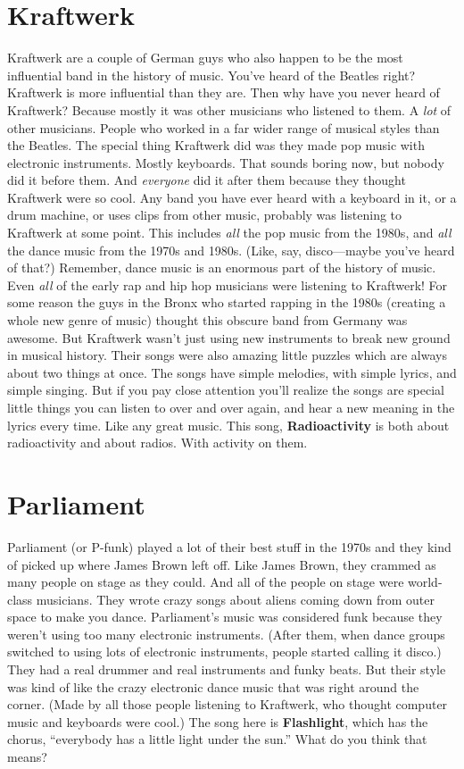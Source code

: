 \documentclass[letterpaper,single]{article}
\begin{document}
\section{Kraftwerk}
Kraftwerk are a couple of German guys who also happen to be the most influential band in the history of music. 
You've heard of the Beatles right? 
Kraftwerk is more influential than they are. 
Then why have you never heard of Kraftwerk? 
Because mostly it was other musicians who listened to them. 
A \emph{lot} of other musicians. 
People who worked in a far wider range of musical styles than the Beatles. 
The special thing Kraftwerk did was they made pop music with electronic instruments. 
Mostly keyboards. 
That sounds boring now, but nobody did it before them. 
And \emph{everyone} did it after them because they thought Kraftwerk were so cool. 
Any band you have ever heard with a keyboard in it, or a drum machine, or uses clips from other music, probably was listening to Kraftwerk at some point. 
This includes \emph{all} the pop music from the 1980s, and \emph{all} the dance music from the 1970s and 1980s. (Like, say, disco---maybe you've heard of that?)
Remember, dance music is an enormous part of the history of music.
Even \emph{all} of the early rap and hip hop musicians were listening to Kraftwerk! 
For some reason the guys in the Bronx who started rapping in the 1980s (creating a whole new genre of music) thought this obscure band from Germany was awesome. 
But Kraftwerk wasn't just using new instruments to break new ground in musical history. 
Their songs were also amazing little puzzles which are always about two things at once. 
The songs have simple melodies, with simple lyrics, and simple singing. 
But if you pay close attention you'll realize the songs are special little things you can listen to over and over again, and hear a new meaning in the lyrics every time. 
Like any great music. 
This song, \textbf{Radioactivity} is both about radioactivity and about radios. With activity on them.

\section{Parliament}
Parliament (or P-funk) played a lot of their best stuff in the 1970s and they kind of picked up where James Brown left off. 
Like James Brown, they crammed as many people on stage as they could. 
And all of the people on stage were world-class musicians. 
They wrote crazy songs about aliens coming down from outer space to make you dance. 
Parliament's music was considered funk because they weren't using too many electronic instruments. 
(After them, when dance groups switched to using lots of electronic instruments, people started calling it disco.) 
They had a real drummer and real instruments and funky beats.
But their style was kind of like the crazy electronic dance music that was right around the corner. 
(Made by all those people listening to Kraftwerk, who thought computer music and keyboards were cool.)
The song here is \textbf{Flashlight}, which has the chorus, ``everybody has a little light under the sun.'' 
What do you think that means?
\end{document}
